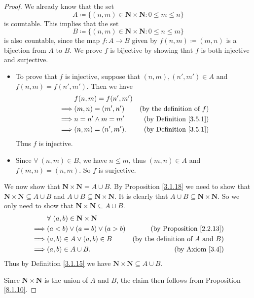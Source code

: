 \begin{proof}
    We already know that the set
    \[
        A \coloneqq \{(n, m) \in \mathbf{N} \times \mathbf{N} : 0 \leq m \leq n\}
    \]
    is countable.
    This implies that the set
    \[
        B \coloneqq \{(n, m) \in \mathbf{N} \times \mathbf{N} : 0 \leq n \leq m\}
    \]
    is also countable, since the map \(f : A \to B\) given by \(f(n, m) \coloneqq (m, n)\) is a bijection from \(A\) to \(B\).
    We prove \(f\) is bijective by showing that \(f\) is both injective and surjective.
    \begin{itemize}
        \item To prove that \(f\) is injective, suppose that \((n, m), (n', m') \in A\) and \(f(n, m) = f(n', m')\).
              Then we have
              \begin{align*}
                           & f(n, m) = f(n', m')                                       \\
                  \implies & (m, n) = (m', n')   & \text{(by the definition of \(f\))} \\
                  \implies & n = n' \land m = m' & \text{(by Definition \ref{3.5.1})}  \\
                  \implies & (n, m) = (n', m').  & \text{(by Definition \ref{3.5.1})}
              \end{align*}
              Thus \(f\) is injective.
        \item Since \(\forall\ (n, m) \in B\), we have \(n \leq m\), thus \((m, n) \in A\) and \(f(m, n) = (n, m)\).
              So \(f\) is surjective.
    \end{itemize}

    We now show that \(\mathbf{N} \times \mathbf{N} = A \cup B\).
    By Proposition \ref{3.1.18} we need to show that \(\mathbf{N} \times \mathbf{N} \subseteq A \cup B\) and \(A \cup B \subseteq \mathbf{N} \times \mathbf{N}\).
    It is clearly that \(A \cup B \subseteq \mathbf{N} \times \mathbf{N}\).
    So we only need to show that \(\mathbf{N} \times \mathbf{N} \subseteq A \cup B\).
    \begin{align*}
                 & \forall\ (a, b) \in \mathbf{N} \times \mathbf{N}                                                 \\
        \implies & (a < b) \lor (a = b) \lor (a > b)                & \text{(by Proposition \ref{2.2.13})}          \\
        \implies & (a, b) \in A \lor (a, b) \in B                   & \text{(by the definition of \(A\) and \(B\))} \\
        \implies & (a, b) \in A \cup B.                             & \text{(by Axiom \ref{3.4})}
    \end{align*}
    Thus by Definition \ref{3.1.15} we have \(\mathbf{N} \times \mathbf{N} \subseteq A \cup B\).

    Since \(\mathbf{N} \times \mathbf{N}\) is the union of \(A\) and \(B\), the claim then follows from Proposition \ref{8.1.10}.
\end{proof}

